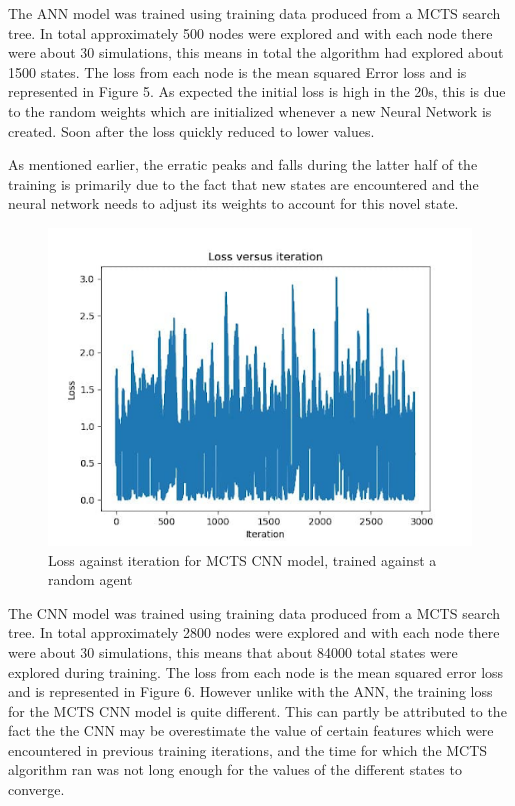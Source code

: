 \documentclass[a4paper,12pt,table]{article}
\begin{document}
The ANN model was trained using training data produced from a MCTS search tree. In total approximately 500 nodes were explored and with each node there were about 30 simulations, this means in total the algorithm had explored about 1500 states. The loss from each node is the mean squared Error loss and is represented in Figure 5. As expected the initial loss is high in the 20s, this is due to the random weights which are initialized whenever a new Neural Network is created. Soon after the loss quickly reduced to lower values. \par

As mentioned earlier, the erratic peaks and falls during the latter half of the training is primarily due to the fact that new states are encountered and the neural network needs to adjust its weights to account for this novel state.  \par

\begin{figure}[H]
    \begin{center}
        \includegraphics[scale=0.65]{MCTS_CNN.png}
        \caption{Loss against iteration for MCTS CNN model, trained against a random agent}
        \label{fig:}
    \end{center}
\end{figure}
\vspace{-1cm}
The CNN model was trained using training data produced from a MCTS search tree. In total approximately 2800 nodes were explored and with each node there were about 30 simulations, this means that about 84000 total states were explored during training. The loss from each node is the mean squared error loss and is represented in Figure 6. However unlike with the ANN, the training loss for the MCTS CNN model is quite different. This can partly be attributed to the fact the the CNN may be overestimate the value of certain features which were encountered in previous training iterations, and the time for which the MCTS algorithm ran was not long enough for the values of the different states to converge. \par
\end{document}
